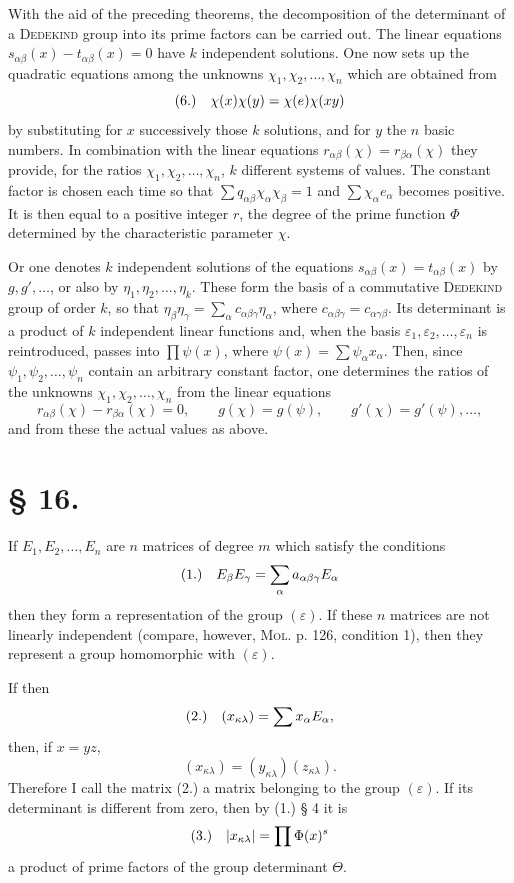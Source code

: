 \documentclass[11pt]{article}
\newcommand{\eps}{\varepsilon}
\newcommand{\fnum}[1]{\textup{(\ensuremath{#1}.)}\quad}
\begin{document}
With the aid of the preceding theorems, the decomposition of the determinant of a \textsc{Dedekind} group into its prime factors can be carried out. The linear equations $s_{\alpha\beta}(x)-t_{\alpha\beta}(x)=0$ have $k$ independent solutions. One now sets up the quadratic equations among the unknowns $\chi_1,\chi_2,\ldots,\chi_n$ which are obtained from
\[
\fnum{6} \chi(x)\chi(y)=\chi(e)\chi(xy)
\]
by substituting for $x$ successively those $k$ solutions, and for $y$ the $n$ basic numbers. In combination with the linear equations $r_{\alpha\beta}(\chi)=r_{\beta\alpha}(\chi)$ they provide, for the ratios $\chi_1,\chi_2,\ldots,\chi_n$, $k$ different systems of values. The constant factor is chosen each time so that $\sum q_{\alpha\beta}\chi_\alpha\chi_\beta=1$ and $\sum\chi_\alpha e_\alpha$ becomes positive. It is then equal to a positive integer $r$, the degree of the prime function $\Phi$ determined by the characteristic parameter $\chi$.

Or one denotes $k$ independent solutions of the equations $s_{\alpha\beta}(x)=t_{\alpha\beta}(x)$ by $g,g',\ldots$, or also by $\eta_1,\eta_2,\ldots,\eta_k$. These form the basis of a commutative \textsc{Dedekind} group of order $k$, so that $\eta_\beta\eta_\gamma=\sum_\alpha c_{\alpha\beta\gamma}\eta_\alpha$, where $c_{\alpha\beta\gamma}=c_{\alpha\gamma\beta}$. Its determinant is a product of $k$ independent linear functions and, when the basis $\eps_1,\eps_2,\ldots,\eps_n$ is reintroduced, passes into $\prod\psi(x)$, where $\psi(x)=\sum\psi_\alpha x_\alpha$. Then, since $\psi_1,\psi_2,\ldots,\psi_n$ contain an arbitrary constant factor, one determines the ratios of the unknowns $\chi_1,\chi_2,\ldots,\chi_n$ from the linear equations
\[
 r_{\alpha\beta}(\chi)-r_{\beta\alpha}(\chi)=0,
 \qquad g(\chi)=g(\psi),
 \qquad g'(\chi)=g'(\psi),\ldots,
\]
and from these the actual values as above.

\section*{§ 16.}

If $E_1,E_2,\ldots,E_n$ are $n$ matrices of degree $m$ which satisfy the conditions
\[
\fnum{1} E_\beta E_\gamma=\sum_\alpha a_{\alpha\beta\gamma}E_\alpha
\]
then they form a representation of the group $(\eps)$. If these $n$ matrices are not linearly independent (compare, however, \textsc{Mol}. p. 126, condition 1), then they represent a group homomorphic with $(\eps)$.

If then
\[
\fnum{2} (x_{\kappa\lambda})=\sum x_\alpha E_\alpha,
\]
then, if $x=yz$,
\[
 (x_{\kappa\lambda})=(y_{\kappa\lambda})(z_{\kappa\lambda}).
\]
Therefore I call the matrix (2.) a matrix belonging to the group $(\eps)$. If its determinant is different from zero, then by (1.) § 4 it is
\[
\fnum{3} |x_{\kappa\lambda}|=\prod\Phi(x)^s
\]
a product of prime factors of the group determinant $\Theta$.
\end{document}
